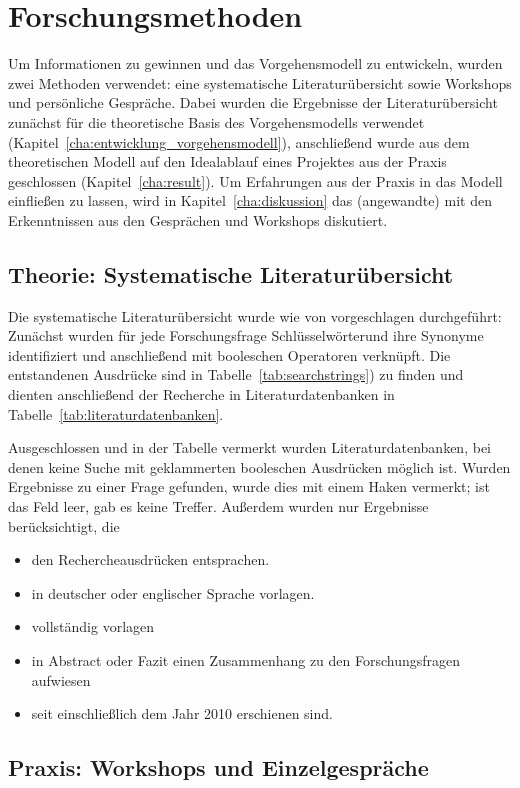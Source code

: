 \section{Forschungsmethoden}
Um Informationen zu gewinnen und das Vorgehensmodell zu entwickeln, wurden zwei 
Methoden verwendet: eine systematische Literaturübersicht sowie Workshops und 
persönliche Gespräche. Dabei wurden die Ergebnisse der Literaturübersicht 
zunächst für die theoretische Basis des Vorgehensmodells verwendet 
(Kapitel~\ref{cha:entwicklung_vorgehensmodell}), anschließend wurde aus dem 
theoretischen Modell auf den Idealablauf eines Projektes aus der Praxis 
geschlossen (Kapitel~\ref{cha:result}). Um Erfahrungen aus der Praxis in das 
Modell einfließen zu lassen, wird in Kapitel~\ref{cha:diskussion} das 
(angewandte) mit den Erkenntnissen aus den Gesprächen und Workshops diskutiert.
\subsection{Theorie: Systematische Literaturübersicht}
\label{cha:method}
Die systematische Literaturübersicht wurde wie von  
vorgeschlagen durchgeführt: Zunächst wurden für jede Forschungsfrage 
Schlüsselwörterund ihre Synonyme identifiziert und anschließend mit booleschen 
Operatoren verknüpft. Die entstandenen Ausdrücke sind in 
Tabelle~\ref{tab:searchstrings}) zu finden und dienten anschließend der 
Recherche in Literaturdatenbanken in Tabelle~\ref{tab:literaturdatenbanken}.

Ausgeschlossen und in der Tabelle vermerkt wurden Literaturdatenbanken, bei 
denen keine Suche mit geklammerten booleschen Ausdrücken möglich ist. Wurden 
Ergebnisse zu einer Frage gefunden, wurde dies mit einem Haken vermerkt; ist 
das Feld leer, gab es keine Treffer.
Außerdem wurden nur Ergebnisse berücksichtigt, die
\begin{itemize}
	\item den Rechercheausdrücken entsprachen.
	\item in deutscher oder englischer Sprache vorlagen.
	\item vollständig vorlagen
	\item in Abstract oder Fazit einen Zusammenhang zu den Forschungsfragen
aufwiesen
	\item seit einschließlich dem Jahr 2010 erschienen sind.
\end{itemize}

\begin{comment}
In diesem Kapitel erläutern Sie ihre Forschungsmethode unter Verwendung von
entsprechenden Quellen.
Begründen Sie auch, warum Sie sich für diese Forschungsmethode entschieden
haben
und warum sie geeignet ist, die vorliegende Forschungsfrage zu beantworten.
\end{comment}
\subsection{Praxis: Workshops und Einzelgespräche}